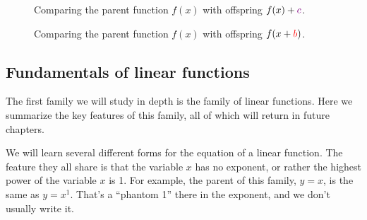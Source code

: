 \begin{figure}[p]
\begin{minipage}{0.32\linewidth}
	\centering
\end{minipage}
%
\begin{minipage}{0.32\linewidth}
	\centering
\end{minipage}
%
\begin{minipage}{0.32\linewidth}
	\centering
\end{minipage}
\caption{Comparing the parent function $f(x)$ with offspring $f(x)+{\color{violet}c}$.}
\label{fig:transc}
\end{figure}

\begin{figure}[p]
\begin{minipage}{0.32\linewidth}
	\centering
\end{minipage}
%
\begin{minipage}{0.32\linewidth}
	\centering
\end{minipage}
%
\begin{minipage}{0.32\linewidth}
	\centering
\end{minipage}
\caption{Comparing the parent function $f(x)$ with offspring $f(x+{\color{red}b})$.}
\label{fig:transb}
\end{figure}


\subsection{Fundamentals of linear functions}

The first family we will study in depth is the family of linear functions. Here we summarize the key features of this family, all of which will return in future chapters.

We will learn several different forms for the equation of a linear function. The feature they all share is that the variable $x$ has no exponent, or rather the highest power of the variable $x$ is 1. For example, the parent of this family, $y = x$, is the same as $y = x^1$. That's a ``phantom 1'' there in the exponent, and we don't usually write it.

